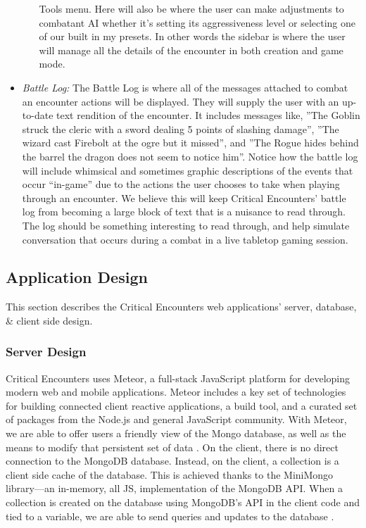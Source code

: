 \documentclass[letterpaper, 10 pt, conference]{ieeeconf}
\begin{document}
\begin{itemize}
\begin{itemize}
		Tools menu. Here will also be where the user can make adjustments to combatant
		AI whether it’s setting its aggressiveness level or selecting one of our built in my
		presets. In other words the sidebar is where the user will manage all the details
		of the encounter in both creation and game mode. \\
	\end{itemize}
	\item \textit{Battle Log:} The Battle Log is where all of the messages attached to combat an
	encounter actions will be displayed. They will supply the user with an up-to-date
	text rendition of the encounter. It includes messages like, ”The Goblin struck
	the cleric with a sword dealing 5 points of slashing damage”, ”The wizard cast
	Firebolt at the ogre but it missed”, and ”The Rogue hides behind the barrel the
	dragon does not seem to notice him”. Notice how the battle log will include whimsical and sometimes graphic descriptions of the events that occur ``in-game'' due to the actions the user chooses to take when playing through an encounter. We believe this will keep Critical Encounters' battle log from becoming a large block of text that is a nuisance to read through. The log should be something interesting to read through, and help simulate conversation that occurs during a combat in a live tabletop gaming session.
\end{itemize}
\subsection{Application Design}
This section describes the Critical Encounters web applications' server, database, \& client side design.
\subsubsection{Server Design}
Critical Encounters uses Meteor, a full-stack JavaScript platform for developing modern web and mobile
applications. Meteor includes a key set of technologies for building connected client
reactive applications, a build tool, and a curated set of packages from the
Node.js and general JavaScript community. With Meteor, we are able to offer users a friendly view of the Mongo database, as well as the means to modify that persistent set of data \cite{c1}. On the client, there is no direct connection to the MongoDB database.
Instead, on the client, a collection is a client side cache of the database. This is
achieved thanks to the MiniMongo library—an in-memory, all JS, implementation
of the MongoDB API. When a collection is created on the database using MongoDB's API in the client code and tied to a variable, we are able to send queries and updates to the database \cite{c1}.
\end{document}
